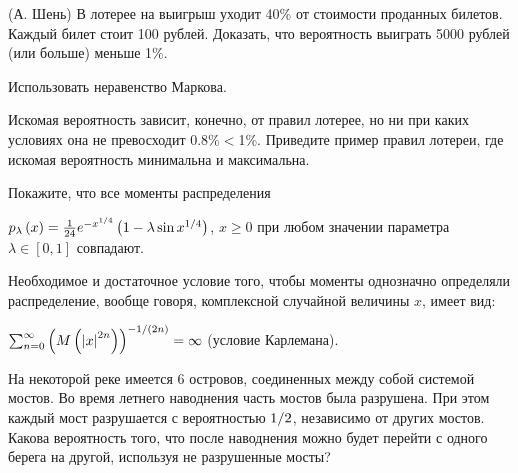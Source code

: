 \begin{problem}

 (А. Шень) В лотерее на выигрыш уходит 40\% от стоимости проданных билетов. Каждый билет стоит 100 рублей. Доказать, что вероятность выиграть 5000 рублей (или больше) меньше 1\%.

\begin{ordre} 
Использовать неравенство Маркова.
\end{ordre}

Искомая вероятность зависит, конечно, от правил лотерее, но ни при каких условиях она не превосходит 0.8\%$<$1\%.
Приведите пример правил лотереи, где искомая вероятность минимальна и максимальна.

\end{problem}

\begin{problem}

Покажите, что все моменты распределения

 $p_{\lambda } \left(x\right)=\frac{1}{24} e^{-x^{{1\mathord{\left/ {\vphantom {1 4}} \right. \kern-\nulldelimiterspace} 4} } } \left(1-\lambda \sin x^{{1\mathord{\left/ {\vphantom {1 4}} \right. \kern-\nulldelimiterspace} 4} } \right)$, $x\ge 0$ при любом значении параметра $\lambda \in \left[0,1\right]$ совпадают.

\begin{remark}

Необходимое и достаточное условие того, чтобы моменты однозначно определяли распределение, вообще говоря, комплексной случайной величины $x$, имеет вид:

\noindent $\sum _{n=0}^{\infty }\left(M\left(\left|x\right|^{2n} \right)\right)^{{-1\mathord{\left/ {\vphantom {-1 \left(2n\right)}} \right. \kern-\nulldelimiterspace} \left(2n\right)} } =\infty  $ (условие Карлемана).
\end{remark}

\end{problem} 

\begin{problem}

На некоторой реке имеется 6 островов, соединенных между собой системой мостов. Во время летнего наводнения часть мостов была разрушена. При этом каждый мост разрушается с вероятностью ${1\mathord{\left/ {\vphantom {1 2}} \right. \kern-\nulldelimiterspace} 2} $, независимо от других мостов. Какова вероятность того, что после наводнения можно будет перейти с одного берега на другой, используя не разрушенные мосты?


\end{problem}

